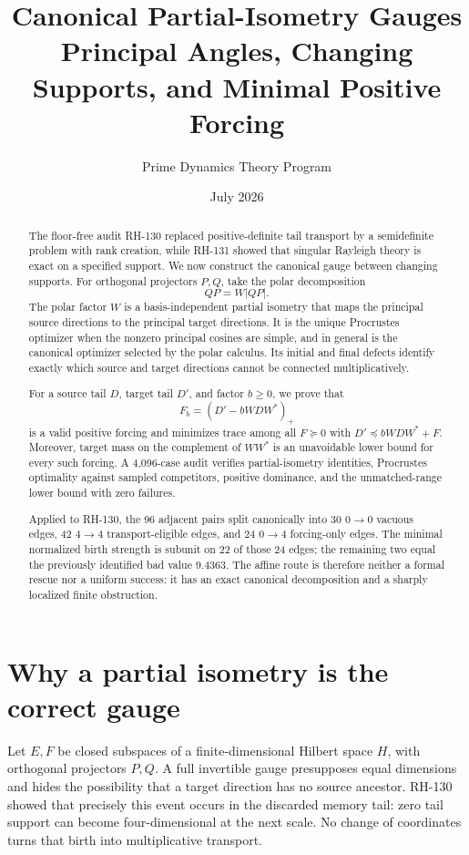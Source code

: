 \documentclass[12pt]{article}
\title{Canonical Partial-Isometry Gauges\\\large Principal Angles, Changing Supports, and Minimal Positive Forcing}
\author{Prime Dynamics Theory Program}
\date{July 2026}
\begin{document}
\maketitle

\begin{abstract}
The floor-free audit RH-130 replaced positive-definite tail transport by a
semidefinite problem with rank creation, while RH-131 showed that singular
Rayleigh theory is exact on a specified support.  We now construct the
canonical gauge between changing supports.  For orthogonal projectors
$P,Q$, take the polar decomposition
\[
 QP=W|QP|.
\]
The polar factor $W$ is a basis-independent partial isometry that maps the
principal source directions to the principal target directions.  It is the
unique Procrustes optimizer when the nonzero principal cosines are simple,
and in general is the canonical optimizer selected by the polar calculus.
Its initial and final defects identify exactly which source and target
directions cannot be connected multiplicatively.

For a source tail $D$, target tail $D'$, and factor $b\geq0$, we prove that
\[
 F_b=(D'-bWDW^*)_+
\]
is a valid positive forcing and minimizes trace among all $F\succeq0$ with
$D'\preceq bWDW^*+F$.  Moreover, target mass on the complement of
$WW^*$ is an unavoidable lower bound for every such forcing.  A 4,096-case
audit verifies partial-isometry identities, Procrustes optimality against
sampled competitors, positive dominance, and the unmatched-range lower
bound with zero failures.

Applied to RH-130, the 96 adjacent pairs split canonically into 30
$0\to0$ vacuous edges, 42 $4\to4$ transport-eligible edges, and 24
$0\to4$ forcing-only edges.  The minimal normalized birth strength is
subunit on 22 of those 24 edges; the remaining two equal the previously
identified bad value $9.4363$.  The affine route is therefore neither a
formal rescue nor a uniform success: it has an exact canonical decomposition
and a sharply localized finite obstruction.
\end{abstract}

\section{Why a partial isometry is the correct gauge}
Let $E,F$ be closed subspaces of a finite-dimensional Hilbert space $H$,
with orthogonal projectors $P,Q$.  A full invertible gauge presupposes equal
dimensions and hides the possibility that a target direction has no source
ancestor.  RH-130 showed that precisely this event occurs in the discarded
memory tail: zero tail support can become four-dimensional at the next
scale.  No change of coordinates turns that birth into multiplicative
transport.
\end{document}
